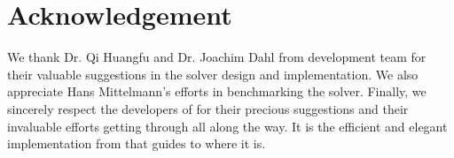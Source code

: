 \section{Acknowledgement}

We thank Dr. Qi Huangfu and Dr. Joachim Dahl from  development team \citep{copt} for their valuable suggestions in the solver design and implementation. We also appreciate
Hans Mittelmann's efforts in benchmarking the solver. Finally, we sincerely
respect the developers of  for their precious suggestions
{\cite{benson2008algorithm}} and their invaluable efforts getting
 through all along the way. It is the efficient and elegant
implementation from  that guides  to
where it is.
